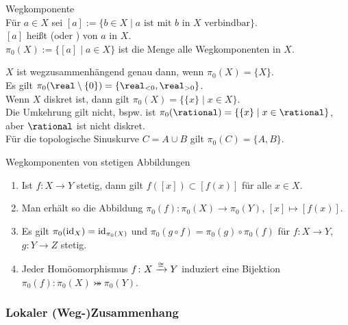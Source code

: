 \begin{Def}{Wegkomponente}\\
    Für $a \in X$ sei
    $[a] := \{b \in X \;|\; a \text{ ist mit } b \text{ in }
    X \text{ verbindbar}\}$. \\
    $[a]$ heißt 
    (oder ) von $a$ in $X$. \\
    $\pi_0(X) := \{[a] \;|\; a \in X\}$ ist die Menge alle Wegkomponenten
    in $X$.
\end{Def}

\begin{Bsp}
    $X$ ist wegzusammenhängend genau dann, wenn $\pi_0(X) = \{X\}$. \\
    Es gilt $\pi_0(\real \setminus \{0\}) = \{\real_{<0}, \real_{>0}\}$. \\
    Wenn $X$ diskret ist, dann gilt $\pi_0(X) = \{\{x\} \;|\; x \in X\}$. \\
    Die Umkehrung gilt nicht, bspw. ist
    $\pi_0(\rational) = \{\{x\} \;|\; x \in \rational\}$,
    aber $\rational$ ist nicht diskret. \\
    Für die topologische Sinuskurve $C = A \cup B$ gilt $\pi_0(C) = \{A, B\}$.
\end{Bsp}

\begin{Satz}{Wegkomponenten von stetigen Abbildungen}
    \begin{enumerate}
        \item
        Ist $f\colon X \rightarrow Y$ stetig, dann gilt
        $f([x]) \subset [f(x)]$ für alle $x \in X$.

        \item
        Man erhält so die Abbildung
        $\pi_0(f)\colon \pi_0(X) \rightarrow \pi_0(Y)$,
        $[x] \mapsto [f(x)]$.

        \item
        Es gilt $\pi_0(\operatorname{id}_X) = \operatorname{id}_{\pi_0(X)}$ und
        $\pi_0(g \circ f) = \pi_0(g) \circ \pi_0(f)$ für
        $f\colon X \rightarrow Y$, $g\colon Y \rightarrow Z$ stetig.

        \item
        Jeder Homöomorphismus $f\colon X \xrightarrow{\cong} Y$ induziert eine Bijektion
        $\pi_0(f)\colon \pi_0(X) \bij \pi_0(Y)$.
    \end{enumerate}
\end{Satz}

\subsubsection{%
    Lokaler (Weg-)Zusammenhang%
}

